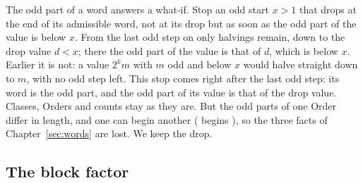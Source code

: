 \documentclass[10pt,a4paper,titlepage]{article}
\begin{document}
The odd part of a word answers a what-if. Stop an odd start $x > 1$ that drops at the end of its
admissible word, not at its drop but as soon as the odd part of the value is below $x$. From the last odd step on
only halvings remain, down to the drop value $d < x$; there the odd part of the
value is that of $d$, which is below $x$. Earlier it is not: a value $2^k m$
with $m$ odd and below $x$ would halve straight down to $m$, with no odd step
left. This stop comes right after the last odd step: its word is the odd part, and
the odd part of its value is that of the drop value. Classes, Orders and counts stay as
they are. But the odd parts of one Order differ in length, and one can begin
another ( begins ), so the three facts of
Chapter~\ref{sec:words} are lost. We keep the drop.

\subsection*{The block factor}
\end{document}
